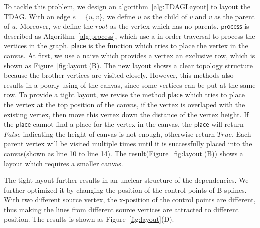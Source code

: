 To tackle this problem, we design an algorithm~\ref{alg:TDAGLayout} to layout the TDAG. With an edge $e=\{u,v\}$, we define $u$ as the child of $v$ and $v$ as the parent of $u$. Moreover, we define the $root$ as the vertex which has no parents. $\mathsf{process}$ is described as Algorithm~\ref{alg:process}, which use a in-order traversal to process the vertices in the graph.  $\mathsf{place}$ is the function which tries to place the vertex in the canvas. At first, we use a naive which provides a vertex an exclusive row, which is shown as Figure~\ref{fig:layout}(B). The new layout shows a clear topology structure because the brother vertices are visited closely. However, this methods also results in a poorly using of the canvas, since some vertices can be put at the same row.  
To provide a tight layout, we revise the method $\mathsf{place}$ which tries to place the vertex at the top position of the canvas, if the vertex is overlaped with the existing vertex, then move this vertex down the distance of the vertex height. If the $\mathsf{place}$ cannot find a place for the vertex in the canvas, the $\mathsf{place}$ will return $False$ indicating the height of canvas is not enough, otherwise return $True$. Each parent vertex will be visited multiple times until it is successfully placed into the canvas(shown as line 10 to line 14). The result(Figure~\ref{fig:layout}(B)) shows a layout which requires a smaller canvas.

The tight layout further results in an unclear structure of the dependencies. We further optimized it by changing the position of the control points of B-splines. With two different source vertex, the x-position of the control points are different, thus making the lines from different source vertices are attracted to different position. The results is shown as Figure~\ref{fig:layout}(D).

